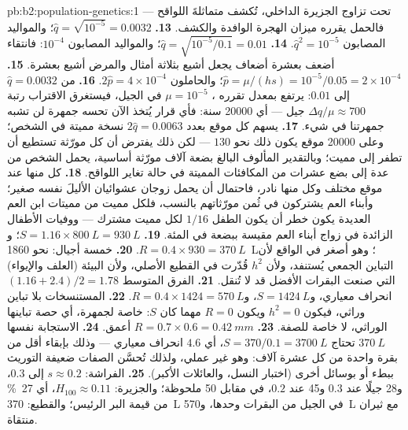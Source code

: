 \begin{solution}{pb:b2:population-genetics:1}
تحت تزاوج الجزيرة الداخلي، تُكشف متماثلةَ اللواقح --- فالحمل
يقرره ميزان الهجرة الوافدة والكشف.
\textbf{13.} $\hat q = \sqrt{10^{-5}} = 0.0032$؛ والمواليد المصابون $\hat
q^{2} = 10^{-5}$.
\textbf{14.} $\hat q = \sqrt{10^{-5}/0.1} = 0.01$؛ والمواليد المصابون
$10^{-4}$: فانتقاء أضعف بعشرة أضعاف يجعل  أشيع بثلاثة
أمثال والمرض أشيع بعشرة.
\textbf{15.} $\hat p = \mu/(hs) = 10^{-5}/0.05 = 2\times 10^{-4}$؛
والحاملون $2\hat p = 4\times 10^{-4}$.
\textbf{16.} من $\hat q = 0.0032$ إلى $0.01$: يرتفع  بمعدل
تقرره ، $\mu = 10^{-5}$ في الجيل، فيستغرق
الاقتراب رتبة $\Delta q/\mu \approx 700$ جيل ---
أي \num{20000} سنة: فأي قرار يُتخذ الآن تحسه جمهرة
لن تشبه جمهرتنا في شيء.
\textbf{17.} يسهم كل موقع بعدد $2\hat q = 0.0063$ نسخة مميتة
في الشخص؛ وعلى \num{20000} موقع يكون ذلك نحو $130$ --- لكن ذلك يفترض
أن كل مورّثة تستطيع أن تطفر إلى  مميت؛ وبالتقدير
المألوف البالغ بضعة آلاف مورّثة أساسية، يحمل الشخص
من عدة إلى بضع عشرات من المكافئات المميتة في حالة تغاير اللواقح.
\textbf{18.} كل منها عند موقع مختلف وكل منها نادر، فاحتمال
أن يحمل زوجان عشوائيان الأليلَ نفسه صغير؛
وأبناء العم يشتركون في ثُمن مورّثاتهم بالنسب، فلكل مميت من
مميتات ابن العم العديدة يكون خطر أن يكون الطفل 
$1/16$ لكل مميت مشترك --- ووفيات الأطفال الزائدة في زواج
أبناء العم مقيسة ببضعة في المئة.
\textbf{19.} $S = 1.16\times \qty{800}{L} = \qty{930}{L}$؛ و$R = 0.4\times
930 = \qty{370}{L}$.
\textbf{20.} خمسة أجيال: نحو \qty{1860}{L}؛ وهو أصغر في
الواقع لأن التباين الجمعي يُستنفد، ولأن $h^{2}$
قُدّرت في القطيع الأصلي، ولأن البيئة
(العلف والإيواء) التي صنعت البقرات الأفضل قد لا تُنقل.
\textbf{21.} الفرق المتوسط $(1.16 + 2.4)/2 = 1.78$ انحراف
معياري، و$S = \qty{1424}{L}$، و$R = 0.4\times 1424 = \qty{570}{L}$.
\textbf{22.} المستنسخات بلا تباين وراثي، فيكون $h^{2} = 0$ ويكون $R =
0$ مهما كان $S$:  خاصة لجمهرة، أي
حصة تباينها الوراثي، لا خاصة للصفة.
\textbf{23.} $R = 0.7\times 0.6 = \qty{0.42}{mm}$ أعمق.
\textbf{24.} الاستجابة نفسها $\qty{370}{L}$ تحتاج $S = 370/0.1 =
\qty{3700}{L}$، أي $4.6$ انحراف معياري --- وذلك بإبقاء أقل
من بقرة واحدة من كل عشرة آلاف: وهو غير عملي، ولذلك
تُحسَّن الصفات ضعيفة التوريث ببطء أو بوسائل أخرى
(اختبار النسل، والعائلات الأكبر).
\textbf{25.} الفراشة: $s \approx 0.2$ إلى $0.3$، و28 جيلًا عند $0.3$
و45 عند $0.2$، في مقابل 50 ملحوظة؛ والجزيرة: $H_{100} \approx 0.11$،
أي \qty{27}{\%} من قيمة البر الرئيس؛ والقطيع: \qty{370}{L} في الجيل من
البقرات وحدها، و\qty{570}{L} مع ثيران منتقاة.
\end{solution}
